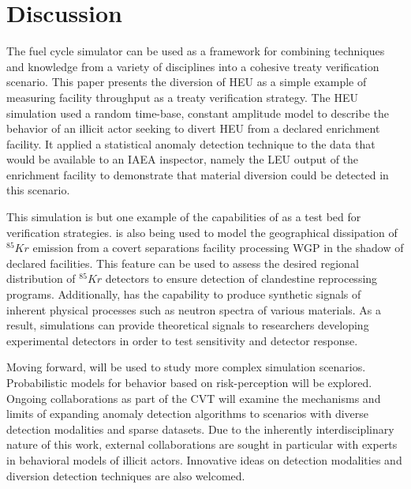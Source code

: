 \section{Discussion}
\label{s_dis}

The \Cyclus fuel cycle simulator can be used as a framework for combining techniques and knowledge from a variety of disciplines into a cohesive treaty verification scenario. This paper presents the diversion of \gls{HEU} as a simple example of measuring facility throughput as a treaty verification strategy.  The \gls{HEU} simulation used a random time-base, constant amplitude model to describe the behavior of an illicit actor seeking to divert \gls{HEU} from a declared enrichment facility.  It applied a statistical anomaly detection technique to the data that would be available to an \gls{IAEA} inspector, namely the \gls{LEU} output of the enrichment facility to demonstrate that material diversion could be detected in this scenario.

This simulation is but one example of the capabilities of \Cyclus as a test bed for verification strategies.  \Cyclus is also being used to model the geographical dissipation of $^{85}Kr$ emission from a covert separations facility processing \gls{WGP} in the shadow of declared facilities.  This feature can be used to assess the desired regional distribution of $^{85}Kr$ detectors to ensure detection of clandestine reprocessing programs.  Additionally, \Cyclus has the capability to produce synthetic signals of inherent physical processes such as neutron spectra of various materials.  As a result, \Cyclus simulations can provide theoretical signals to researchers developing experimental detectors in order to test sensitivity and detector response.

Moving forward, \Cyclus will be used to study more complex simulation scenarios.  Probabilistic models for behavior based on risk-perception will be explored.  Ongoing collaborations as part of the \gls{CVT} will examine the mechanisms and limits of expanding anomaly detection algorithms to scenarios with diverse detection modalities and sparse datasets.  Due to the inherently interdisciplinary nature of this work, external collaborations are sought in particular with experts in behavioral models of illicit actors. Innovative ideas on detection modalities and diversion detection techniques are also welcomed.



\textit{}